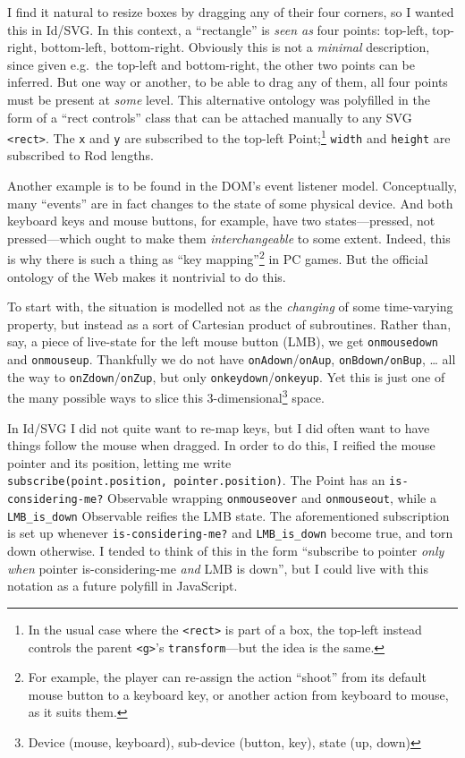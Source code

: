 I find it natural to resize boxes by dragging any of their four corners,
so I wanted this in Id{}/SVG. In this context, a ``rectangle'' is
\emph{seen as} four points: top-left, top-right, bottom-left,
bottom-right. Obviously this is not a \emph{minimal} description, since
given e.g.~the top-left and bottom-right, the other two points can be
inferred. But one way or another, to be able to drag any of them, all
four points must be present at \emph{some} level. This alternative
ontology was polyfilled in the form of a ``rect controls'' class that
can be attached manually to any SVG
\texttt{\textless{}rect\textgreater{}}. The \texttt{x} and \texttt{y}
are subscribed to the top-left Point;\footnote{In the usual case where
  the \texttt{\textless{}rect\textgreater{}} is part of a box, the
  top-left instead controls the parent
  \texttt{\textless{}g\textgreater{}}'s \texttt{transform}---but the
  idea is the same.} \texttt{width} and \texttt{height} are subscribed
to Rod lengths.

Another example is to be found in the DOM's event listener model.
Conceptually, many ``events'' are in fact changes to the state of some
physical device. And both keyboard keys and mouse buttons, for example,
have two states---pressed, not pressed---which ought to make them
\emph{interchangeable} to some extent. Indeed, this is why there is such
a thing as ``key mapping''\footnote{For example, the player can
  re-assign the action ``shoot'' from its default mouse button to a
  keyboard key, or another action from keyboard to mouse, as it suits
  them.} in PC games. But the official ontology of the Web makes it
nontrivial to do this.

To start with, the situation is modelled not as the \emph{changing} of
some time-varying property, but instead as a sort of Cartesian product
of subroutines. Rather than, say, a piece of live-state for the left
mouse button (LMB), we get \texttt{onmousedown} and \texttt{onmouseup}.
Thankfully we do not have \texttt{onAdown}/\texttt{onAup},
\texttt{onBdown/onBup}, \ldots{} all the way to
\texttt{onZdown}/\texttt{onZup}, but only
\texttt{onkeydown}/\texttt{onkeyup}. Yet this is just one of the many
possible ways to slice this 3-dimensional\footnote{Device (mouse,
  keyboard), sub-device (button, key), state (up, down)} space.

In Id{}/SVG I did not quite want to re-map keys, but I did often want to
have things follow the mouse when dragged. In order to do this, I
reified the mouse pointer and its position, letting me write
\texttt{subscribe(point.position,\ pointer.position)}. The Point has an
\texttt{is-considering-me?} Observable wrapping \texttt{onmouseover} and
\texttt{onmouseout}, while a \texttt{LMB\_is\_down} Observable reifies
the LMB state. The aforementioned subscription is set up whenever
\texttt{is-considering-me?} and \texttt{LMB\_is\_down} become true, and
torn down otherwise. I tended to think of this in the form ``subscribe
to pointer \emph{only when} pointer is-considering-me \emph{and} LMB is
down'', but I could live with this notation as a future polyfill in
JavaScript.

